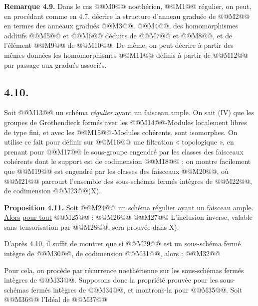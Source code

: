 
\textbf{Remarque 4.9.} Dans le cas @@M0@@ noethérien, @@M1@@ régulier, on peut, en procédant comme en 4.7, décrire la structure d'anneau graduée de @@M2@@ en termes des anneaux gradués @@M3@@, @@M4@@, des homomorphismes additifs @@M5@@ et @@M6@@ déduits de @@M7@@ et @@M8@@, et de l'élément @@M9@@ de @@M10@@. De même, on peut décrire à partir des mêmes données les homomorphismes @@M11@@ définis à partir de @@M12@@ par passage aux gradués associés.

\subsection*{4.10.}

Soit @@M13@@ un schéma \emph{régulier} ayant un faisceau ample. On sait (IV\qquad) que les groupes de Grothendieck formés avec les @@M14@@-Modules localement libres de type fini, et avec les @@M15@@-Modules cohérents, sont isomorphes. On utilise ce fait pour définir sur @@M16@@ une filtration « topologique », en prenant pour @@M17@@ le sous-groupe engendré par les classes des faisceaux cohérents dont le support est de codimension @@M18@@ ; on montre facilement que @@M19@@ est engendré par les classes des faisceaux @@M20@@, où @@M21@@ parcourt l'ensemble des sous-schémas fermés intègres de @@M22@@, de codimension @@M23@@(X\qquad).

\textbf{Proposition 4.11.} \uline{Soit} @@M24@@ \uline{un schéma régulier ayant un faisceau ample}. \uline{Alors} \uline{pour tout} @@M25@@ :
@@M26@@
@@M27@@ L'inclusion inverse, valable sans tensorisation par @@M28@@, sera prouvée dans X\qquad).

D'après 4.10, il suffit de montrer que si @@M29@@ est un sous-schéma fermé intègre de @@M30@@, de codimension @@M31@@, alors :
@@M32@@

Pour cela, on procède par récurrence noethérienne sur les sous-schémas fermés intègres de @@M33@@. Supposons donc la propriété prouvée pour les sous-schémas fermés intègres de @@M34@@, et montrons-la pour @@M35@@. Soit @@M36@@ l'Idéal de @@M37@@
